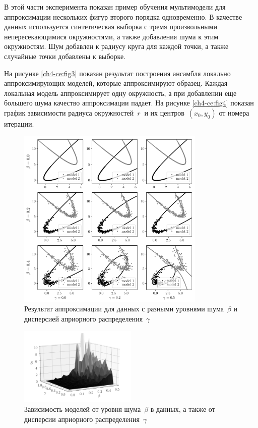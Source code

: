 В этой части эксперимента показан пример обучения мультимодели для аппроксимации нескольких фигур второго порядка одновременно. В качестве данных используется синтетическая выборка с тремя произвольными непересекающимися окружностями, а также добавления шума к этим окружностям. Шум добавлен к радиусу круга для каждой точки, а также случайные точки добавлены к выборке.

На рисунке \ref{ch4-ce:fig3} показан результат построения ансамбля локально аппроксимирующих моделей, которые аппроксимируют образец. Каждая локальная модель аппроксимирует одну окружность, а при добавлении еще большего шума качество аппроксимации падает.
На рисунке \ref{ch4-ce:fig4} показан график зависимости радиуса окружностей~$ r~$ и их центров~$(x_0, y_0)$ от номера итерации.

\begin{figure}[h!t]
\center
\includegraphics[width=0.8\textwidth]{results/priorexpertfig/beta_gamma}
\caption{Результат аппроксимации для данных с разными уровнями шума~$\beta$ и дисперсией априорного распределения~$\gamma$}
\label{ch4-ce:fig6}
\end{figure}

\begin{figure}[h!t]
\center
\includegraphics[width=0.5\textwidth]{results/priorexpertfig/3dplot}
\caption{Зависимость моделей от уровня шума~$\beta$ в данных, а также от дисперсии априорного распределения~$\gamma$}
\label{ch4-ce:fig5}
\end{figure}

